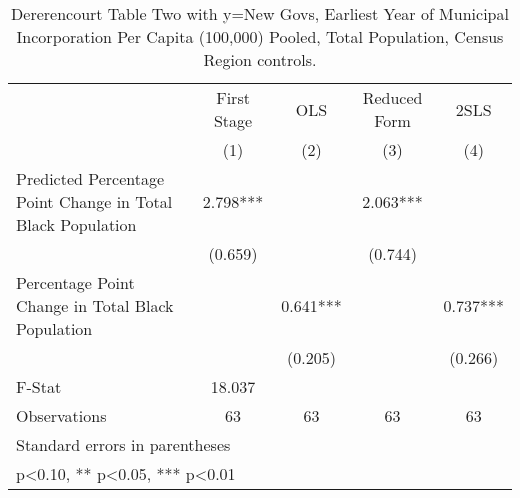 \begin{table}[htbp]\centering
\def\sym#1{\ifmmode^{#1}\else\(^{#1}\)\fi}
\caption{Dererencourt Table Two with y=New Govs, Earliest Year of Municipal Incorporation Per Capita (100,000) Pooled, Total Population, Census Region controls.}
\begin{tabular}{l*{4}{c}}
\toprule
                    & First Stage   &         OLS   &Reduced Form   &        2SLS   \\
                    &\multicolumn{1}{c}{(1)}   &\multicolumn{1}{c}{(2)}   &\multicolumn{1}{c}{(3)}   &\multicolumn{1}{c}{(4)}   \\
\midrule
Predicted Percentage Point Change in Total Black Population&       2.798***&               &       2.063***&               \\
                    &     (0.659)   &               &     (0.744)   &               \\
\addlinespace
Percentage Point Change in Total Black Population&               &       0.641***&               &       0.737***\\
                    &               &     (0.205)   &               &     (0.266)   \\
\midrule
F-Stat              &      18.037   &               &               &               \\
Observations        &          63   &          63   &          63   &          63   \\
\bottomrule
\multicolumn{5}{l}{\footnotesize Standard errors in parentheses}\\
\multicolumn{5}{l}{\footnotesize * p<0.10, ** p<0.05, *** p<0.01}\\
\end{tabular}
\end{table}

